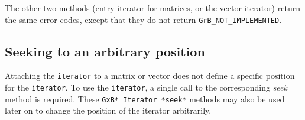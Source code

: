 \documentclass[12pt]{article}
\begin{document}
The other two methods (entry iterator for matrices, or the vector iterator)
return the same error codes, except that they
do not return \verb'GrB_NOT_IMPLEMENTED'.

\subsection{Seeking to an arbitrary position}

Attaching the \verb'iterator' to a matrix or vector does not define a specific
position for the \verb'iterator'.  To use the \verb'iterator', a single call to
the corresponding {\em seek} method is required.  These
\verb'GxB*_Iterator_*seek*' methods may also be used later on to change the
position of the iterator arbitrarily.
\end{document}

